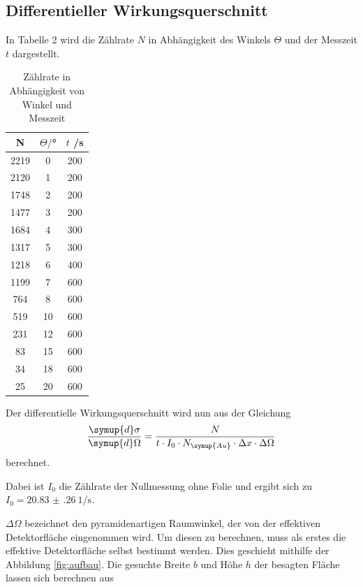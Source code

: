 \subsection{Differentieller Wirkungsquerschnitt}
In Tabelle 2 wird die Zählrate $N$ in Abhängigkeit des Winkels $\Theta$ und der Messzeit $t$ dargestellt.


\begin{table}[H]
  \centering
  \caption{Zählrate in Abhängigkeit von Winkel und Messzeit}
  \label{tab:Parameter}
  \begin{tabular}{c c c}
    \toprule
    N & $\Theta/$° & $t$ /s\\
    \midrule
    2219 &  0 & 200 \\
    2120 &  1 & 200 \\
    1748 &  2 & 200 \\
    1477 &  3 & 200 \\
    1684 &  4 & 300 \\
    1317 &  5 & 300 \\
    1218 &  6 & 400 \\
    1199 &  7 & 600 \\
     764 &  8 & 600 \\
     519 & 10 & 600 \\
     231 & 12 & 600 \\
      83 & 15 & 600 \\
      34 & 18 & 600 \\
      25 & 20 & 600 \\
    \bottomrule
  \end{tabular}
\end{table}

Der differentielle Wirkungsquerschnitt wird nun aus der Gleichung
\begin{equation}
  \frac{\symup{d}\sigma}{\symup{d}\Omega} = \frac{N}{t \cdot I_0 \cdot N_\symup{Au} \cdot \Delta x \cdot \Delta \Omega}
  \label{eqn:wq}
\end{equation}
berechnet.

Dabei ist $I_0$ die Zählrate der Nullmessung ohne Folie und ergibt sich zu $I_0 =\SI{20.83(26)}{1\per\second}$.

$\Delta \Omega$ bezeichnet den pyramidenartigen Raumwinkel, der von
der effektiven Detektorfläche eingenommen wird. Um diesen zu berechnen, muss
als erstes die effektive Detektorfläche selbst bestimmt werden. Dies geschieht
mithilfe der Abbildung \ref{fig:aufbau}. Die gesuchte Breite $b$ und Höhe $h$ der
besagten Fläche lassen sich berechnen aus

